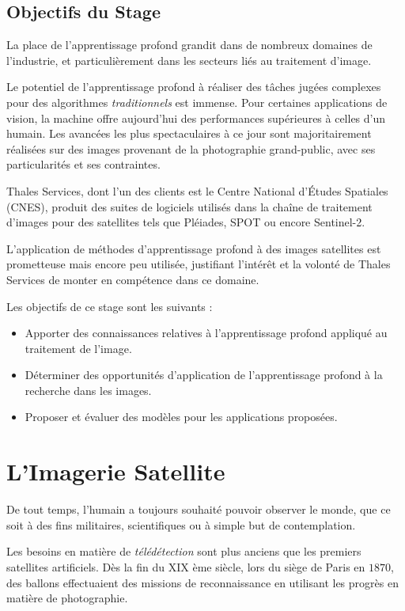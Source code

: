 \documentclass[a4paper, 10pt]{report}
\begin{document}
\section{Objectifs du Stage}
La place de l'apprentissage profond grandit dans de nombreux domaines de l'industrie, et particulièrement dans les secteurs liés au traitement d'image.

Le potentiel de l'apprentissage profond à réaliser des tâches jugées complexes pour des algorithmes \emph{traditionnels} est immense.
Pour certaines applications de vision, la machine offre aujourd'hui des performances supérieures à celles d'un humain.
Les avancées les plus spectaculaires à ce jour sont majoritairement réalisées sur des images provenant de la photographie grand-public, avec ses particularités et ses contraintes.

Thales Services, dont l'un des clients est le Centre National d'Études Spatiales (CNES), produit des suites de logiciels utilisés dans la chaîne de traitement d'images pour des satellites tels que Pléiades, SPOT ou encore Sentinel-2.

L'application de méthodes d'apprentissage profond à des images satellites est prometteuse mais encore peu utilisée, justifiant l'intérêt et la volonté de Thales Services de monter en compétence dans ce domaine.

Les objectifs de ce stage sont les suivants :
\begin{itemize}
	\item Apporter des connaissances relatives à l'apprentissage profond appliqué au traitement de l'image.
	\item Déterminer des opportunités d'application de l'apprentissage profond à la recherche dans les images.
	\item Proposer et évaluer des modèles pour les applications proposées.
\end{itemize}

\chapter{L'Imagerie Satellite}
De tout temps, l'humain a toujours souhaité pouvoir observer le monde, que ce soit à des fins militaires, scientifiques ou à simple but de contemplation.

Les besoins en matière de \emph{télédétection} sont plus anciens que les premiers satellites artificiels. Dès la fin du XIX ème siècle, lors du siège de Paris en $1870$, des ballons effectuaient des missions de reconnaissance en utilisant les progrès en matière de photographie.
\end{document}
